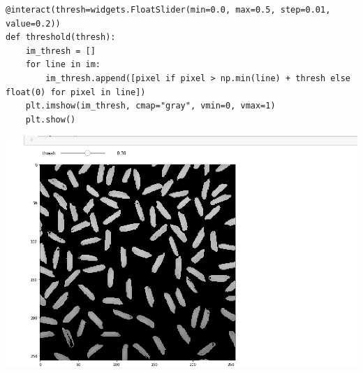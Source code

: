 \begin{verbatim}
@interact(thresh=widgets.FloatSlider(min=0.0, max=0.5, step=0.01, value=0.2))
def threshold(thresh):
    im_thresh = []
    for line in im:
        im_thresh.append([pixel if pixel > np.min(line) + thresh else float(0) for pixel in line])
    plt.imshow(im_thresh, cmap="gray", vmin=0, vmax=1)
    plt.show()
\end{verbatim}

\begin{center}
    \includegraphics[width=0.6\linewidth]{img/ipywidgets_example}
\end{center}
